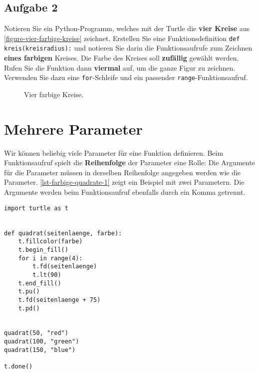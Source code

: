 
\newpage

\subsection{Aufgabe 2}

Notieren Sie ein Python-Programm, welches mit der Turtle die \textbf{vier Kreise} aus \autoref{figure-vier-farbige-kreise} zeichnet. Erstellen Sie eine Funktionsdefinition \lstinline{def kreis(kreisradius):} und notieren Sie darin die Funktionsaufrufe zum Zeichnen \textbf{eines farbigen} Kreises. Die Farbe des Kreises soll \textbf{zufällig} gewählt werden. Rufen Sie die Funktion dann \textbf{viermal} auf, um die ganze Figur zu zeichnen. Verwenden Sie dazu eine \lstinline{for}-Schleife und ein passender \lstinline{range}-Funktionsaufruf.

\begin{figure}[htb]
\centering
{}
\caption{Vier farbige Kreise.}
\label{figure-vier-farbige-kreise}
\end{figure}


\newpage

\section{Mehrere Parameter}

Wir können beliebig viele Parameter für eine Funktion definieren. Beim Funktionsaufruf spielt die \textbf{Reihenfolge} der Parameter eine Rolle: Die Argumente für die Parameter müssen in derselben Reihenfolge angegeben werden wie die Parameter. \autoref{lst-farbige-quadrate-1} zeigt ein Beispiel mit zwei Parametern. Die Argumente werden beim Funktionsaufruf ebenfalls durch ein Komma getrennt.

\begin{lstlisting}[caption={Funktion mit zwei Parametern (\graybgtexttt{drei\_farbige\_quadrate.py}).}, label={lst-farbige-quadrate-1}]
import turtle as t


def quadrat(seitenlaenge, farbe):
    t.fillcolor(farbe)
    t.begin_fill()
    for i in range(4):
        t.fd(seitenlaenge)
        t.lt(90)
    t.end_fill()
    t.pu()
    t.fd(seitenlaenge + 75)
    t.pd()


quadrat(50, "red")
quadrat(100, "green")
quadrat(150, "blue")

t.done()
\end{lstlisting}

